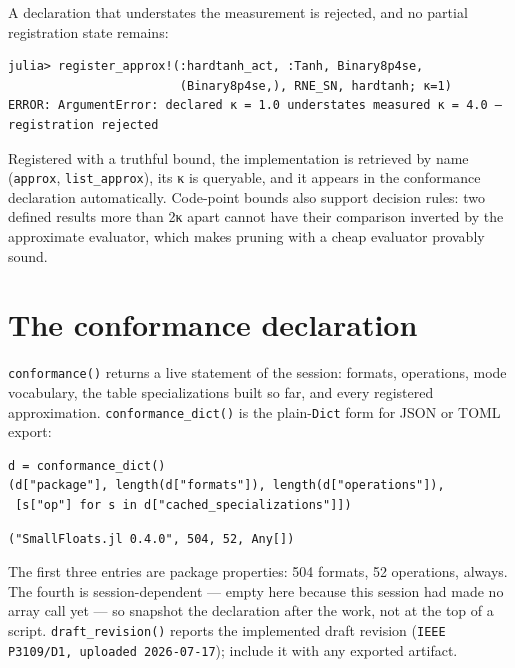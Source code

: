 A declaration that understates the measurement is rejected, and no partial registration state remains:




\begin{verbatim}
julia> register_approx!(:hardtanh_act, :Tanh, Binary8p4se,
                        (Binary8p4se,), RNE_SN, hardtanh; κ=1)
ERROR: ArgumentError: declared κ = 1.0 understates measured κ = 4.0 — registration rejected
\end{verbatim}



Registered with a truthful bound, the implementation is retrieved by name (\texttt{approx}, \texttt{list\_approx}), its κ is queryable, and it appears in the conformance declaration automatically. Code-point bounds also support decision rules: two defined results more than 2κ apart cannot have their comparison inverted by the approximate evaluator, which makes pruning with a cheap evaluator provably sound.



\section{The conformance declaration}



\label{15718388096894276699}{}


\texttt{conformance()} returns a live statement of the session: formats, operations, mode vocabulary, the table specializations built so far, and every registered approximation. \texttt{conformance\_dict()} is the plain-\texttt{Dict} form for JSON or TOML export:




\begin{verbatim}
d = conformance_dict()
(d["package"], length(d["formats"]), length(d["operations"]),
 [s["op"] for s in d["cached_specializations"]])
\end{verbatim}




\begin{verbatim}
("SmallFloats.jl 0.4.0", 504, 52, Any[])
\end{verbatim}



The first three entries are package properties: 504 formats, 52 operations, always. The fourth is session-dependent — empty here because this session had made no array call yet — so snapshot the declaration after the work, not at the top of a script. \texttt{draft\_revision()} reports the implemented draft revision (\texttt{IEEE P3109/D1, uploaded 2026-07-17}); include it with any exported artifact.



